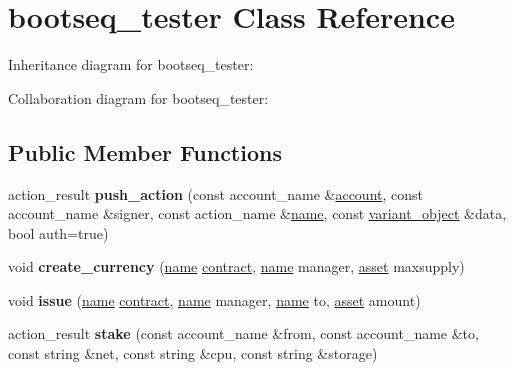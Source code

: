 \hypertarget{classbootseq__tester}{}\section{bootseq\+\_\+tester Class Reference}
\label{classbootseq__tester}


Inheritance diagram for bootseq\+\_\+tester\+:


Collaboration diagram for bootseq\+\_\+tester\+:
\subsection*{Public Member Functions}
\begin{DoxyCompactItemize}
\item 
\mbox{\label{classbootseq__tester_a852d6205099c4fc87284c4d52667def8}} 
action\+\_\+result {\bfseries push\+\_\+action} (const account\+\_\+name \&\mbox{\hyperlink{structaccount}{account}}, const account\+\_\+name \&signer, const action\+\_\+name \&\mbox{\hyperlink{structaacio_1_1name}{name}}, const \mbox{\hyperlink{classfc_1_1variant__object}{variant\+\_\+object}} \&data, bool auth=true)
\item 
\mbox{\label{classbootseq__tester_aa0cf907c8314c78fa1008daaee0e8fd4}} 
void {\bfseries create\+\_\+currency} (\mbox{\hyperlink{structaacio_1_1name}{name}} \mbox{\hyperlink{structaacio_1_1contract}{contract}}, \mbox{\hyperlink{structaacio_1_1name}{name}} manager, \mbox{\hyperlink{structaacio_1_1asset}{asset}} maxsupply)
\item 
\mbox{\label{classbootseq__tester_adda32bfb79dea78bad37d32f2099bdc7}} 
void {\bfseries issue} (\mbox{\hyperlink{structaacio_1_1name}{name}} \mbox{\hyperlink{structaacio_1_1contract}{contract}}, \mbox{\hyperlink{structaacio_1_1name}{name}} manager, \mbox{\hyperlink{structaacio_1_1name}{name}} to, \mbox{\hyperlink{structaacio_1_1asset}{asset}} amount)
\item 
\mbox{\label{classbootseq__tester_a71d608950bdce19f8da27dd1ded33896}} 
action\+\_\+result {\bfseries stake} (const account\+\_\+name \&from, const account\+\_\+name \&to, const string \&net, const string \&cpu, const string \&storage)
\item 
\mbox{\label{classbootseq__tester_a81f2dd7305cba47d6683a4ee332312f6}} 

\end{DoxyCompactItemize}
